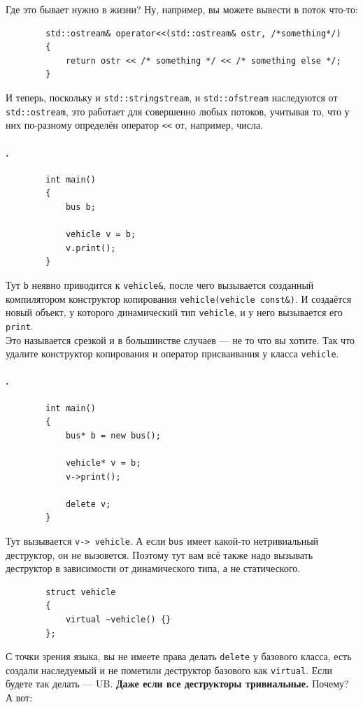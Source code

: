 \documentclass{article}
\begin{document}
    Где это бывает нужно в жизни? Ну, например, вы можете вывести в поток что-то:
    \begin{verbatim}
        std::ostream& operator<<(std::ostream& ostr, /*something*/)
        {
            return ostr << /* something */ << /* something else */;
        }
    \end{verbatim}
    И теперь, поскольку и \texttt{std::stringstream}, и \texttt{std::ofstream} наследуются от \texttt{std::ostream}, это работает для совершенно любых потоков, учитывая то, что у них по-разному определён оператор \texttt{<<} от, например, числа.
    \paragraph{.}
    \label{par:slicing}
    \begin{verbatim}
        int main()
        {
            bus b;

            vehicle v = b;
            v.print();
        }
    \end{verbatim}
    Тут \texttt{b} неявно приводится к \texttt{vehicle&}, после чего вызывается созданный компилятором конструктор копирования \texttt{vehicle(vehicle const&)}. И создаётся новый объект, у которого динамический тип \texttt{vehicle}, и у него вызывается его \texttt{print}.\\
    Это называется срезкой и в большинстве случаев --- не то что вы хотите. Так что удалите конструктор копирования и оператор присваивания у класса \texttt{vehicle}.
    \paragraph{.}
    \begin{verbatim}
        int main()
        {
            bus* b = new bus();

            vehicle* v = b;
            v->print();
            
            delete v;
        }
    \end{verbatim}
    Тут вызывается \texttt{v->~vehicle}. А если \texttt{bus} имеет какой-то нетривиальный деструктор, он не вызовется. Поэтому тут вам всё также надо вызывать деструктор в зависимости от динамического типа, а не статического.
    \begin{verbatim}
        struct vehicle
        {
            virtual ~vehicle() {}
        };
    \end{verbatim}
    С точки зрения языка, вы не имеете права делать \texttt{delete} у базового класса, есть создали наследуемый и не пометили деструктор базового как \texttt{virtual}. Если будете так делать --- UB. \textbf{Даже если все деструкторы тривиальные.} Почему? А вот:
\end{document}
